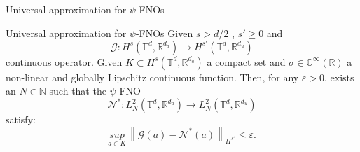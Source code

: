 \documentclass{beamer}
\newcommand{\numberset}{\mathbb}
\newcommand{\N}{\numberset{N}}
\newcommand{\R}{\numberset{R}}
\newcommand{\C}{\numberset{C}}
\begin{document}

\begin{frame}{Universal approximation for $\psi$-FNOs}
	\begin{themedTitleBlock}{Universal approximation for $\psi$-FNOs} %
		Given $ s > d/2$ , $ s' \ge 0 $ and 
		\[ \mathcal{G}: H^s(\mathbb{T}^d, \R^{d_a}) \to H^{s'}(\mathbb{T}^d, \R^{d_u}) \]
		continuous operator. Given $ K \subset H^s(\mathbb{T}^d, \R^{d_a}) $ a compact set and $ \sigma \in \C^{\infty}(\R) $ a non-linear and globally Lipschitz continuous function. Then, for any $ \varepsilon > 0 $, exists an $ N \in \N $ such that the $ \psi $-FNO 
		\[ \mathcal{N}^{*}: L^2_N(\mathbb{T}^d, \R^{d_a}) \to L^2_N(\mathbb{T}^d, \R^{d_u}) \]
		satisfy:
		\[ \underset{a \in K}{sup}\, \left\| \mathcal{G}(a) - \mathcal{N}^{*}(a) \right\|_{H^{s'}} \le \varepsilon.  \]
	\end{themedTitleBlock}	
\end{frame}

\end{document}
